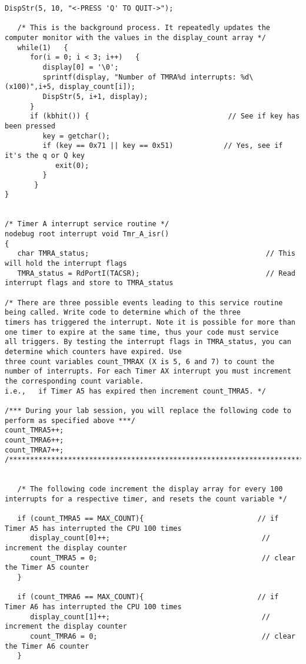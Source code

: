\begin{lstlisting}[frame=single]
   DispStr(5, 10, "<-PRESS 'Q' TO QUIT->");

   /* This is the background process. It repeatedly updates the computer monitor with the values in the display_count array */
   while(1)   {
      for(i = 0; i < 3; i++)   {
         display[0] = '\0';
         sprintf(display, "Number of TMRA%d interrupts: %d\  (x100)",i+5, display_count[i]);
         DispStr(5, i+1, display);
      }
      if (kbhit()) {                                 // See if key has been pressed
         key = getchar();
         if (key == 0x71 || key == 0x51)            // Yes, see if it's the q or Q key
            exit(0);
         }
       }
}


/* Timer A interrupt service routine */
nodebug root interrupt void Tmr_A_isr()
{
   char TMRA_status;                                          // This will hold the interrupt flags
   TMRA_status = RdPortI(TACSR);                              // Read interrupt flags and store to TMRA_status

/* There are three possible events leading to this service routine being called. Write code to determine which of the three
timers has triggered the interrupt. Note it is possible for more than one timer to expire at the same time, thus your code must service
all triggers. By testing the interrupt flags in TMRA_status, you can determine which counters have expired. Use
three count variables count_TMRAX (X is 5, 6 and 7) to count the number of interrupts. For each Timer AX interrupt you must increment the corresponding count variable.
i.e.,   if Timer A5 has expired then increment count_TMRA5. */

/*** During your lab session, you will replace the following code to perform as specified above ***/
count_TMRA5++;
count_TMRA6++;
count_TMRA7++;
/**************************************************************************************************/


   /* The following code increment the display array for every 100 interrupts for a respective timer, and resets the count variable */

   if (count_TMRA5 == MAX_COUNT){                           // if Timer A5 has interrupted the CPU 100 times
      display_count[0]++;                                    // increment the display counter
      count_TMRA5 = 0;                                       // clear the Timer A5 counter
   }

   if (count_TMRA6 == MAX_COUNT){                           // if Timer A6 has interrupted the CPU 100 times
      display_count[1]++;                                    // increment the display counter
      count_TMRA6 = 0;                                       // clear the Timer A6 counter
   }


\end{lstlisting}
